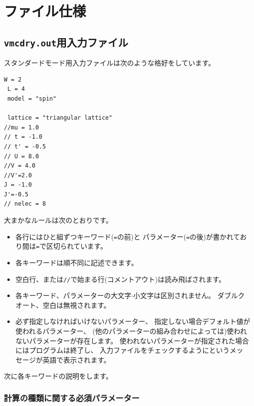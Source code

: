 \chapter{ファイル仕様}

\section{\texttt{vmcdry.out}用入力ファイル}
\label{Ch:HowToStandard}

スタンダードモード用入力ファイルは次のような格好をしています。

\begin{minipage}{10cm}
\begin{screen}
\begin{verbatim}
W = 2
 L = 4
 model = "spin"

 lattice = "triangular lattice"
//mu = 1.0
// t = -1.0
// t' = -0.5
// U = 8.0
//V = 4.0
//V'=2.0
J = -1.0
J'=-0.5
// nelec = 8
\end{verbatim}
\end{screen}
\end{minipage}

大まかなルールは次のとおりです。
\begin{itemize}
\item 各行にはひと組ずつキーワード(\verb|=|の前)と
  パラメーター(\verb|=|の後)が書かれており間は\verb|=|で区切られています。
\item 各キーワードは順不同に記述できます。
\item 空白行、または\verb|//|で始まる行(コメントアウト)は読み飛ばされます。
\item 各キーワード、パラメーターの大文字$\cdot$小文字は区別されません。
  ダブルクオート、空白は無視されます。
\item 必ず指定しなければいけないパラメーター、
  指定しない場合デフォルト値が使われるパラメーター、
  (他のパラメーターの組み合わせによっては)使われないパラメーターが存在します。
  使われないパラメーターが指定された場合にはプログラムは終了し、
  入力ファイルをチェックするようにというメッセージが英語で表示されます。
\end{itemize}

次に各キーワードの説明をします。

\subsection{計算の種類に関する必須パラメーター}

